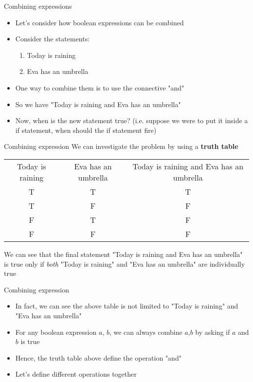 \documentclass[10pt,xcolor={table,dvipsnames},t]{beamer}
\begin{document}
\begin{frame}{Combining expressions}
  \begin{itemize}
    \item Let's consider how boolean expressions can be combined
    \item Consider the statements:
    \begin{enumerate}
      \item Today is raining
      \item Eva has an umbrella
    \end{enumerate}
    \item One way to combine them is to use the connective "and"
    \item So we have "Today is raining and Eva has an umbrella"
    \item Now, when is the new statement true? (i.e. suppose we were to put it inside a if statement, when should the if statement fire)
  \end{itemize}
\end{frame}

\begin{frame}{Combining expression}
  We can investigate the problem by using a \textbf{truth table}
  \begin{table}[]
    \begin{tabular}{ccc}
    Today is raining & Eva has an umbrella & Today is raining and Eva has an umbrella \\
    T                & T                   & T                                        \\
    T                & F                   & F                                        \\
    F                & T                   & F                                        \\
    F                & F                   & F                                       
    \end{tabular}
    \end{table}
    We can see that the final statement "Today is raining and Eva has an umbrella" is true only if \textit{both} "Today is raining" and "Eva has an umbrella" are individually true
\end{frame}

\begin{frame}{Combining expression}
  \begin{itemize}
    \item In fact, we can see the above table is not limited to "Today is raining" and "Eva has an umbrella"
    \item For any boolean expression $a$, $b$, we can always combine $a$,$b$ by asking if $a$ and $b$ is true
    \item Hence, the truth table above define the operation "and"
    \item Let's define different operations together
  \end{itemize}
\end{frame}
\end{document}
